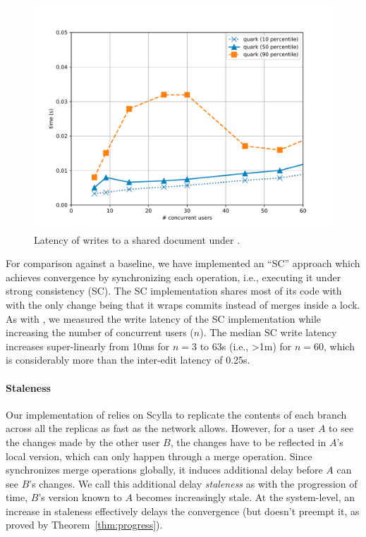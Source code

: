 \begin{figure}[ht]
  \centering
    \includegraphics[scale=0.4]{Figures/monkey_latency}
\caption{Latency of writes to a shared document under \quark. }
\label{fig:latency}
\vspace*{-0.1in}
\end{figure}

For comparison against a baseline, we have implemented an ``SC''
approach which achieves convergence by synchronizing each operation,
i.e., executing it under strong consistency (SC). The SC
implementation shares most of its code with \quark with the only
change being that it wraps commits instead of merges inside a lock.
As with \quark, we measured the write latency of the SC implementation
while increasing the number of concurrent users ($n$).  The median SC
write latency increases super-linearly from 10ms for $n=3$ to 63s
(i.e., >1m) for $n=60$, which is considerably more than the inter-edit
latency of 0.25s.


\noindent\paragraph{Staleness} Our implementation of \quark relies on
Scylla to replicate the contents of each branch across all the
replicas as fast as the network allows. However, for a user $A$ to see
the changes made by the other user $B$, the changes have to be
reflected in $A$'s local version, which can only happen through a
merge operation. Since \quark synchronizes merge operations globally,
it induces additional delay before $A$ can see $B$'s changes. We call
this additional delay \emph{staleness} as with the progression of
time, $B$'s version known to $A$ becomes increasingly stale. At the
system-level, an increase in staleness effectively delays the
convergence (but doesn't preempt it, as proved by
Theorem~\ref{thm:progress}). 

